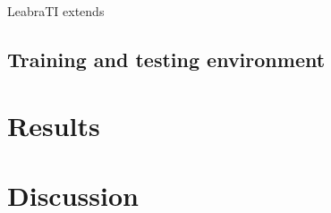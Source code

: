 \documentclass[dwyatte_dissertation.tex]{subfiles}
\begin{document}
LeabraTI extends 

%
%

\subsection{Training and testing environment}

\section{Results}

\section{Discussion}



\end{document}
